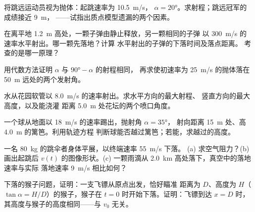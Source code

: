 \begin{exercise}[$\star\star$]\label{exo:g12:projectile-motion:9}
将跳远运动员视为抛体：起跳速率为 \qty{10.5}{m/s}，
$\alpha = \ang{20}$。求射程；跳远冠军的成绩接近 \qty{9}{m}，
——试指出质点模型遗漏的两个因素。
\end{exercise}

\begin{exercise}[$\star\star$]\label{exo:g12:projectile-motion:10}
在离平地 \qty{1.2}{m} 高处，一颗子弹由静止释放，另一颗相同的子弹
以 \qty{300}{m/s} 的速率水平射出。哪一颗先落地？计算
水平射出的子弹的下落时间及落点距离。
考查的是哪一原理？
\end{exercise}

\begin{exercise}[$\star\star$]\label{exo:g12:projectile-motion:11}
用代数方法证明 $\alpha$ 与 $\ang{90} - \alpha$ 的射程相同，
再求使初速率为 \qty{25}{m/s} 的抛体落在 \qty{50}{m}
远处的两个发射角。
\end{exercise}

\begin{exercise}[$\star\star\star$]\label{exo:g12:projectile-motion:12}
水从花园软管以 \qty{8.0}{m/s} 的速率射出。求水平方向的最大射程、
竖直方向的最大高度，以及能浇灌
距离 \qty{5.0}{m} 处花坛的两个喷口角度。
\end{exercise}

\begin{exercise}[$\star\star\star$]\label{exo:g12:projectile-motion:13}
一个球从地面以 \qty{18}{m/s} 的速率踢出，抛射角 $\alpha = \ang{35}$，
射向距离 \qty{15}{m} 处、高 \qty{4.0}{m} 的篱笆。利用轨迹方程
判断球能否越过篱笆；若能，求越过的高度。
\end{exercise}

\begin{exercise}[$\star\star\star$]\label{exo:g12:projectile-motion:14}
一名 \qty{80}{kg} 的跳伞者身体平展，以终端速率 \qty{55}{m/s} 下落。
(a) 求空气阻力？(b) 画出起跳后 $v(t)$ 的图像形状。(c) 一颗雨滴从
\qty{2.0}{km} 高处落下，真空中的落地速率与实际
落地速率 \qty{9}{m/s} 相比如何？
\end{exercise}

\begin{exercise}[$\star\star\star$]\label{exo:g12:projectile-motion:15}
下落的猴子问题，证明：一支飞镖从原点出发，恰好瞄准
距离为 $D$、高度为 $H$（$\tan\alpha = H/D$）的猴子，猴子在
$t = 0$ 时开始下落。证明：飞镖到达 $x = D$ 时，
其高度与猴子的高度相同——与 $v_0$ 无关。
\end{exercise}

